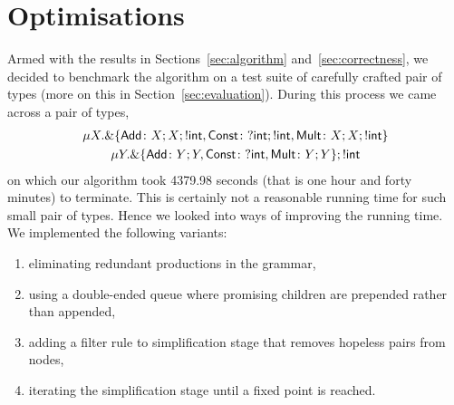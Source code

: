 \section{Optimisations}
\label{sec:optimisations}

Armed with the results in Sections~\ref{sec:algorithm}
and~\ref{sec:correctness}, we decided to benchmark the algorithm on a
test suite of carefully crafted pair of types (more on this in
Section~\ref{sec:evaluation}). During this process we came across a
pair of types,
%
\begin{gather*}
    \mu X . \&\{ \mathsf{Add}\colon X;X; !\mathsf{int},
    \mathsf{Const}\colon ?\mathsf{int};!\mathsf{int},
    \mathsf{Mult}\colon X;X;!\mathsf{int} \}
    \\
    \mu Y . \&\{ \mathsf{Add}\colon Y;Y,
    \mathsf{Const}\colon ?\mathsf{int},
    \mathsf{Mult}\colon Y;Y \}; !\mathsf{int}
\end{gather*}
%
on which our algorithm took 4379.98 seconds (that is one hour and
forty minutes) to terminate. This is certainly not a reasonable
running time for such small pair of types. Hence we
looked into ways of improving the running time. 
We implemented the
following variants: 
\begin{enumerate}
	\item eliminating redundant productions in the grammar,
	\item using a double-ended queue where promising children are
prepended rather than appended,
	\item adding a filter rule to
simplification stage that removes hopeless pairs from nodes,
	\item iterating the simplification stage until a fixed point is reached.
\end{enumerate}




